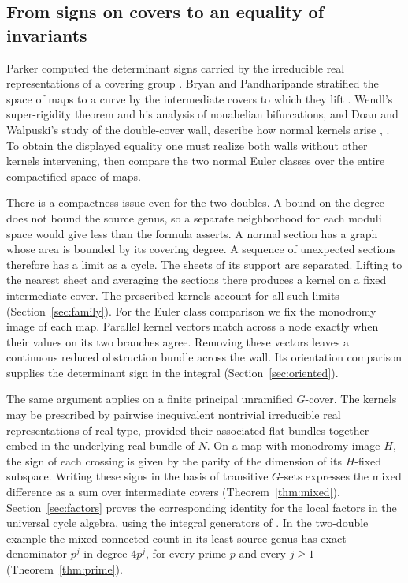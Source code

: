 \subsection*{From signs on covers to an equality of invariants}
Parker computed the determinant signs carried by the irreducible real
representations of a covering group \cite[\S1.2]{parker}.
Bryan and Pandharipande stratified the space of maps to a curve by
the intermediate covers to which they lift \cite[\S2.2]{bp01}.
Wendl's super-rigidity theorem and his analysis of nonabelian
bifurcations, and Doan and Walpuski's study of the double-cover wall,
describe how normal kernels arise \cite[\S2.4]{wendl},
\cite[Theorem~1.3]{dw}. To obtain the displayed equality one must
realize both walls without other kernels intervening, then compare
the two normal Euler classes over the entire compactified space of maps.

There is a compactness issue even for the two doubles. A bound on the
degree does not bound the source genus, so a separate neighborhood for
each moduli space would give less than the formula asserts.
A normal section has a graph whose area is bounded by its covering
degree. A sequence of unexpected sections therefore has a limit as a
cycle. The sheets of its support are separated. Lifting to the nearest
sheet and averaging the sections there produces a kernel on a fixed
intermediate cover. The prescribed kernels account for all such
limits (Section~\ref{sec:family}). For the Euler class comparison we
fix the monodromy image of each map. Parallel kernel vectors match
across a node exactly when their values on its two branches agree.
Removing these vectors leaves a continuous reduced obstruction bundle
across the wall. Its orientation comparison supplies the determinant
sign in the integral (Section~\ref{sec:oriented}).

The same argument applies on a finite principal unramified $G$-cover.
The kernels may be prescribed by pairwise inequivalent nontrivial
irreducible real representations of real type, provided their
associated flat bundles together embed in the underlying real bundle
of $N$. On a map with monodromy image $H$, the sign of each crossing
is given by the parity of the dimension of its $H$-fixed subspace.
Writing these signs in the basis of transitive $G$-sets expresses the
mixed difference as a sum over intermediate covers
(Theorem~\ref{thm:mixed}). Section~\ref{sec:factors} proves the
corresponding identity for the local factors in the universal cycle
algebra, using the integral generators of \cite[Theorem~1.1]{WueGenerators}.
In the two-double example the mixed connected count in its least
source genus has exact denominator $p^j$ in degree $4p^j$, for every
prime $p$ and every $j\ge1$ (Theorem~\ref{thm:prime}).

